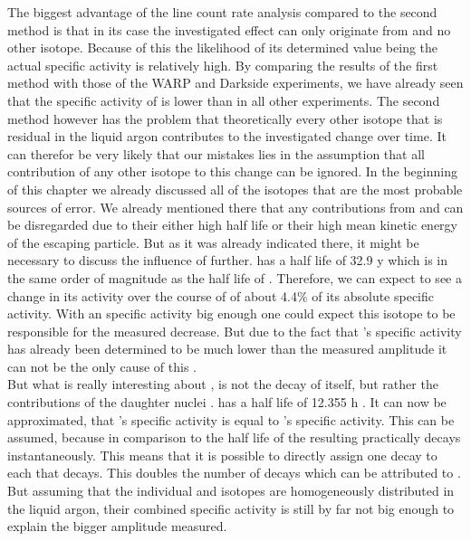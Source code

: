 \documentclass[encoding=utf8,british]{tumphthesis}
\begin{document}
The biggest advantage of the line count rate analysis compared to the second method is that in its case the investigated effect can only originate from \Kr and no other isotope.
Because of this the likelihood of its determined value being the actual specific activity is relatively high.
By comparing the results of the first method with those of the WARP and Darkside experiments, we have already seen that the specific activity of \Kr is lower than in all other experiments.
The second method however has the problem that theoretically every other isotope that is residual in the liquid argon contributes to the investigated change over time.
It can therefor be very likely that our mistakes lies in the assumption that all contribution of any other isotope to this change can be ignored. 
In the beginning of this chapter we already discussed all of the isotopes that are the most probable sources of error.
We already mentioned there that any contributions from  and  can be disregarded due to their either high half life or their high mean kinetic energy of the escaping particle.
But as it was already indicated there, it might be necessary to discuss the influence of  further.
 has a half life of 32.9 y which is in the same order of magnitude as the half life of \Kr.
Therefore, we can expect to see a change in its activity over the course of \PII of about 4.4$\%$ of its absolute specific activity.
With an specific activity big enough one could expect this isotope to be responsible for the measured decrease.
But due to the fact that 's specific activity has already been determined to be much lower than the measured amplitude it can not be the only cause of this .
\\

But what is really interesting about , is not the decay of  itself, but rather the contributions of the daughter nuclei .
 has a half life of 12.355 h \cite{chen_nuclear_2016}.
It can now be approximated, that 's specific activity is equal to 's specific activity.
This can be assumed, because in comparison to the half life of  the resulting  practically decays instantaneously.
This means that it is possible to directly assign one  decay to each  that decays.
This doubles the number of decays which can be attributed to .
But assuming that the individual  and  isotopes are homogeneously distributed in the liquid argon, their combined specific activity is still by far not big enough to explain the bigger amplitude measured.
\\
\end{document}
